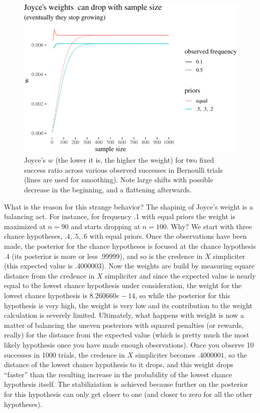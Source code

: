 \documentclass[
  10pt,
  dvipsnames,enabledeprecatedfontcommands]{scrartcl}
\begin{document}
\begin{figure}

\begin{center}\includegraphics[width=1\linewidth]{imprecision_weight_files/figure-latex/joyce3plot-1} \end{center}

\caption{Joyce's $w$ (the lower it is, the higher the weight) for two fixed success ratio across various observed successes in  Bernoulli trials (lines are used for smoothing).  Note large shifts with possible decrease in the beginning, and a flattening afterwards.}
\label{fig:joyce2}
\end{figure}

What is the reason for this strange behavior? The shapinig of Joyce's
weight is a balancing act. For instance, for frequency .1 with equal
priors the weight is maximized at \(n=90\) and starts dropping at
\(n=100\). Why? We start with three chance hypotheses, \(.4, .5, .6\)
with equal priors. Once the observations have been made, the posterior
for the chance hypotheses is focused at the chance hypothesis .4 (its
posterior is more or less .99999), and so is the credence in \(X\)
simpliciter (this expected value is .4000003). Now the weights are build
by measuring square distance from the credence in \(X\) simpliciter and
since the expected value is nearly equal to the lowest chance hypothesis
under consideration, the weight for the lowest chance hypothesis is
\(8.260660e-14\), so while the posterior for this hypothesis is very
high, the weight is very low and its contribution to the weight
calculation is severely limited. Ultimately, what happens with weight is
now a matter of balancing the uneven posteriors with squared penalties
(or rewards, really) for the distance from the expected value (which is
pretty much the most likely hypothesis once you have made enough
observations). Once you observe 10 successes in 1000 trials, the
credence in \(X\) simpliciter becomes \(.4000001\), so the distance of
the lowest chance hypothesis to it drops, and this weight drops
``faster'' than the resulting increase in the probability of the lowest
chance hypothesis itself. The stabiliziation is achieved because further
on the posterior for this hypothesis can only get closer to one (and
closer to zero for all the other hypotheses).
\end{document}
